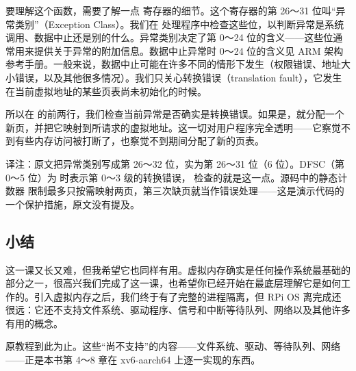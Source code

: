 要理解这个函数，需要了解一点  寄存器的细节。这个寄存器的第 26～31 位叫“异常类别”（Exception Class）。我们在  处理程序中检查这些位，以判断异常是系统调用、数据中止还是别的什么。异常类别决定了第 0～24 位的含义——这些位通常用来提供关于异常的附加信息。数据中止异常时 0～24 位的含义见 ARM 架构参考手册。一般来说，数据中止可能在许多不同的情形下发生（权限错误、地址大小错误，以及其他很多情况）。我们只关心转换错误（translation fault），它发生在当前虚拟地址的某些页表尚未初始化的时候。

所以在  的前两行，我们检查当前异常是否确实是转换错误。如果是，就分配一个新页，并把它映射到所请求的虚拟地址。这一切对用户程序完全透明——它察觉不到有些内存访问被打断了，也察觉不到期间分配了新的页表。

\begin{remark}
  译注：原文把异常类别写成第 26～32 位，实为第 26～31 位（6 位）。DFSC（第 0～5 位）为  时表示第 0～3 级的转换错误， 检查的就是这一点。源码中的静态计数器  限制最多只按需映射两页，第三次缺页就当作错误处理——这是演示代码的一个保护措施，原文没有提及。
\end{remark}

\subsection{小结}

这一课又长又难，但我希望它也同样有用。虚拟内存确实是任何操作系统最基础的部分之一，很高兴我们完成了这一课，也希望你已经开始在最底层理解它是如何工作的。引入虚拟内存之后，我们终于有了完整的进程隔离，但 RPi OS 离完成还很远：它还不支持文件系统、驱动程序、信号和中断等待队列、网络以及其他许多有用的概念。

\begin{remark}
  原教程到此为止。这些“尚不支持”的内容——文件系统、驱动、等待队列、网络——正是本书第 4～8 章在 xv6-aarch64 上逐一实现的东西。
\end{remark}
